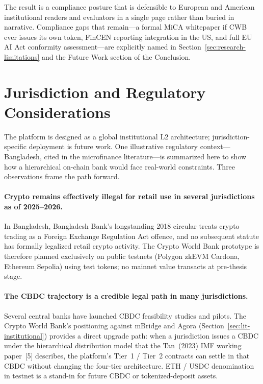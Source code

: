 \documentclass[12pt, a4paper]{report}
\begin{document}
The result is a compliance posture that is defensible to European and American institutional readers and evaluators in a single page rather than buried in narrative. Compliance gaps that remain---a formal MiCA whitepaper if CWB ever issues its own token, FinCEN reporting integration in the US, and full EU AI Act conformity assessment---are explicitly named in Section~\ref{sec:research-limitations} and the Future Work section of the Conclusion.

\section{Jurisdiction and Regulatory Considerations}
\label{sec:bangladesh-reg}

The platform is designed as a global institutional L2 architecture; jurisdiction-specific deployment is future work. One illustrative regulatory context---Bangladesh, cited in the microfinance literature---is summarized here to show how a hierarchical on-chain bank would face real-world constraints. Three observations frame the path forward.

\paragraph{Crypto remains effectively illegal for retail use in several jurisdictions as of 2025--2026.}
In Bangladesh, Bangladesh Bank's longstanding 2018 circular treats crypto trading as a Foreign Exchange Regulation Act offence, and no subsequent statute has formally legalized retail crypto activity. The Crypto World Bank prototype is therefore planned exclusively on public testnets (Polygon zkEVM Cardona, Ethereum Sepolia) using test tokens; no mainnet value transacts at pre-thesis stage.

\paragraph{The CBDC trajectory is a credible legal path in many jurisdictions.}
Several central banks have launched CBDC feasibility studies and pilots. The Crypto World Bank's positioning against mBridge and Agora (Section~\ref{sec:lit-institutional}) provides a direct upgrade path: when a jurisdiction issues a CBDC under the hierarchical distribution model that the Tan~(2023) IMF working paper~[5] describes, the platform's Tier~1 / Tier~2 contracts can settle in that CBDC without changing the four-tier architecture. ETH / USDC denomination in testnet is a stand-in for future CBDC or tokenized-deposit assets.
\end{document}
